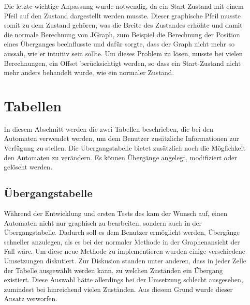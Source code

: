 Die letzte wichtige Anpassung wurde notwendig, da ein Start-Zustand mit einem
Pfeil auf den Zustand dargestellt werden musste. Dieser graphische Pfeil musste
somit zu dem Zustand gehören, was die Breite des Zustandes erhöhte und damit
die normale Berechnung von JGraph, zum Beispiel die Berechnung der Position
eines Überganges beeinflusste und dafür sorgte, dass der Graph nicht mehr so
aussah, wie er intuitiv sein sollte. Um dieses Problem zu lösen, musste bei
vielen Berechnungen, ein Offset berücksichtigt werden, so dass ein
Start-Zustand nicht mehr anders behandelt wurde, wie ein normaler
Zustand.\vspace{10pt}


\section{Tabellen}

In diesem Abschnitt werden die zwei Tabellen beschrieben, die bei den Automaten
verwendet werden, um dem Benutzer zusätzliche Informationen zur Verfügung zu
stellen. Die Übergangstabelle bietet zusätzlich noch die Möglichkeit den
Automaten zu verändern. Es können Übergänge angelegt, modifiziert oder gelöscht
werden.


\subsection{Übergangstabelle}

Während der Entwicklung und ersten Tests des \gtitools kam der Wunsch auf,
einen Automaten nicht nur graphisch zu bearbeiten, sondern auch in der
Übergangstabelle. Dadurch soll es dem Benutzer ermöglicht werden, Übergänge
schneller anzulegen, als es bei der normaler Methode in der Graphenansicht der
Fall wäre. Um diese neue Methode zu implementieren wurden einige verschiedene
Umsetzungen diskutiert. Zur Diskusion standen unter anderen, dass in jeder
Zelle der Tabelle ausgewählt werden kann, zu welchen Zuständen ein Übergang
existiert. Diese Auswahl hätte allerdings bei der Umsetzung schlecht
ausgesehen, zumindest bei hinreichend vielen Zuständen. Aus diesem Grund wurde
dieser Ansatz verworfen.\vspace{10pt}

